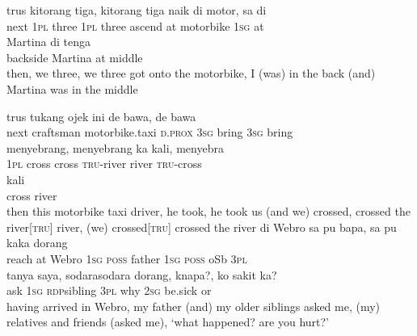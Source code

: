 \ea
\gll   trus    {kitorang}    {tiga,}    {kitorang}   tiga   naik   di   motor,   sa   di\\
  next    {\textsc{1pl}}    {three}    {\textsc{1pl}}   three   ascend   at   motorbike   \textsc{1sg}   at\\
    {Martina}    {di}    {tenga}\\
   {backside}    {Martina}    {at}    {middle}\\
\glt
then, we three, we three got onto the motorbike, I (was) in the back (and) Martina was in the middle
\z

\ea
\gll   trus    {tukang}    {ojek}    {ini}   de    {bawa,}    {de}   bawa\\
  next    {craftsman}    {motorbike.taxi}    {\textsc{d.prox}}   \textsc{3sg}    {bring}    {\textsc{3sg}}   bring\\
    {menyebrang,}    {menyebrang}    {ka}    {kali,}    {menyebra}\\
   {\textsc{1pl}}    {cross}    {cross}    {\textsc{tru}{}-river}    {river}    {\textsc{tru}{}-cross}\\
    {kali}\\
   {cross}    {river}\\
\glt
then this motorbike taxi driver, he took, he took us (and we) crossed, crossed the river[\textsc{tru}] river, (we) crossed[\textsc{tru}] crossed the river
\z
\ea
{}   di    {Webro}   sa    {pu}    {bapa,}   sa    {pu}    {kaka}    {dorang}\\
   {reach}   at    {Webro}   \textsc{1sg}    {\textsc{poss}}    {father}   \textsc{1sg}    {\textsc{poss}}    {oSb}    {\textsc{3pl}}\\
\gll tanya    {saya,}    {sodara{\Tilde}sodara}    {dorang,}    {knapa?,}    {ko}    {sakit}   ka?\\
  ask    {\textsc{1sg}}    {\textsc{rdp}{\Tilde}sibling}    {\textsc{3pl}}    {why}    {\textsc{2sg}}    {be.sick}   or\\
\glt
having arrived in Webro, my father (and) my older siblings asked me, (my) relatives and friends (asked me), ‘what happened? are you hurt?’
\z


